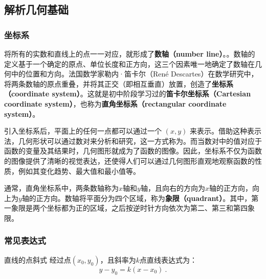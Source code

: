 \subsection{解析几何基础}

\subsubsection{坐标系}
将所有的实数和直线上的点一一对应，就形成了\textbf{数轴（number line）}。。数轴的定义基于一个确定的原点、单位长度和正方向，这三个因素唯一地确定了数轴在几何中的位置和方向。法国数学家勒内·笛卡尔（René Descartes）在数学研究中，将两条数轴的原点重叠，并将其正交（即相互垂直）放置，创造了\textbf{坐标系（coordinate system）}。这就是初中阶段学习过的\textbf{笛卡尔坐标系（Cartesian coordinate system）}，也称为\textbf{直角坐标系（rectangular coordinate system）}。

引入坐标系后，平面上的任何一点都可以通过一个 $(x, y)$ 来表示。借助这种表示法，几何形状可以通过数对来分析和研究，这一方式称为。而当数对中的值对应于函数的变量及其结果时，几何图形就成为了函数的图像。因此，坐标系不仅为函数的图像提供了清晰的视觉表达，还使得人们可以通过几何图形直观地观察函数的性质，例如其变化趋势、最大值和最小值等。

通常，直角坐标系中，两条数轴称为$x$轴和$y$轴，且向右的方向为$x$轴的正方向，向上为$y$轴的正方向。数轴将平面分为四个区域，称为\textbf{象限（quadrant）}。其中，第一象限是两个坐标都为正的区域，之后按逆时针方向依次为第二、第三和第四象限。

\subsubsection{常见表达式}

\begin{definition}{直线的点斜式}\label{def_HsGeBa_1}
经过点$(x_0,y_0)$，且斜率为$k$点直线表达式为：
\begin{equation}
y-y_0=k(x-x_0)~.
\end{equation}
\end{definition}

